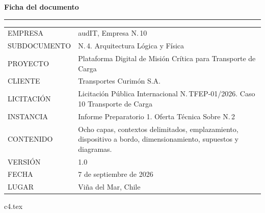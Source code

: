 \documentclass[12pt, letterpaper, table, xcdraw]{inf-pucv}
\begin{document}

\thispagestyle{folioficha}
\vspace*{1.2cm}
{\color{audITnavy}\fontsize{28}{32}\selectfont\bfseries Ficha del documento}

\vspace{10pt}
{\color{audITteal}\rule{\linewidth}{2pt}}

\vspace{22pt}
{\small
\begin{longtable}{@{}p{3.5cm}p{10.5cm}@{}}
\color{audITgris}EMPRESA & \color{black}audIT, Empresa N.\textordmasculine{}\,10 \\
\color{audITgris}SUBDOCUMENTO & \color{black}N.\textordmasculine{}\,4. Arquitectura Lógica y Física \\
\color{audITgris}PROYECTO & \color{black}Plataforma Digital de Misión Crítica para Transporte de Carga \\
\color{audITgris}CLIENTE & \color{black}Transportes Curimón S.A. \\
\color{audITgris}LICITACIÓN & \color{black}Licitación Pública Internacional N.\textordmasculine{}\,TFEP-01/2026. Caso 10 Transporte de Carga \\
\color{audITgris}INSTANCIA & \color{black}Informe Preparatorio 1. Oferta Técnica Sobre N.\textordmasculine{}\,2 \\
\color{audITgris}CONTENIDO & \color{black}Ocho capas, contextos delimitados, emplazamiento, dispositivo a bordo, dimensionamiento, supuestos y diagramas. \\
\color{audITgris}VERSIÓN & \color{black}1.0 \\
\color{audITgris}FECHA & \color{black}7 de septiembre de 2026 \\
\color{audITgris}LUGAR & \color{black}Viña del Mar, Chile \\
\end{longtable}}
\clearpage

\renewcommand{\contentsname}{Índice}
\tableofcontents
\clearpage

{c4.tex}

\clearpage
{}
{}
\printbibliography[title={Bibliografía}]
\end{document}
